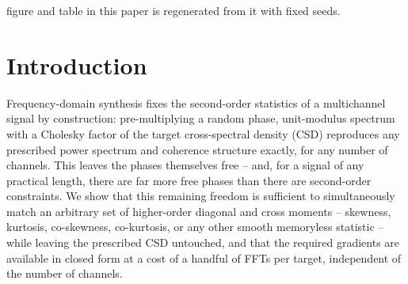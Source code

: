 \documentclass[10pt,a4paper]{article}
\numberwithin{equation}{section}
\begin{document}
figure and table in this paper is regenerated from it with fixed seeds.

\pagestyle{fancy}
\lhead{}%
\chead{}
\rhead{\Large \PaperTitle \vspace{1mm}}
\cfoot{}
\renewcommand{\headrulewidth}{0.5pt}
\renewcommand{\footrulewidth}{0.5pt}


\section*{Introduction}
Frequency-domain synthesis fixes the second-order statistics of a multichannel signal by construction: pre-multiplying a random phase, unit-modulus spectrum with a Cholesky factor of the target cross-spectral density (CSD) reproduces any prescribed power spectrum and coherence structure exactly, for any number of channels. This leaves the phases themselves free -- and, for a signal of any practical length, there are far more free phases than there are second-order constraints. We show that this remaining freedom is sufficient to simultaneously match an arbitrary set of higher-order diagonal and cross moments -- skewness, kurtosis, co-skewness, co-kurtosis, or any other smooth memoryless statistic -- while leaving the prescribed CSD untouched, and that the required gradients are available in closed form at a cost of a handful of FFTs per target, independent of the number of channels.
\end{document}
